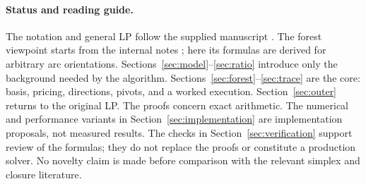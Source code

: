 \documentclass[11pt,a4paper]{article}
\numberwithin{equation}{section}
\theoremstyle{definition}
\theoremstyle{remark}
\begin{document}
\paragraph{Status and reading guide.}
The notation and general LP follow the supplied manuscript
\citet{DoseFuriniLocatelli2026}. The forest viewpoint starts from the internal
notes \citet{ForestNotes}; here its formulas are derived for arbitrary arc
orientations. Sections~\ref{sec:model}--\ref{sec:ratio} introduce only the
background needed by the algorithm. Sections~\ref{sec:forest}--\ref{sec:trace}
are the core: basis, pricing, directions, pivots, and a worked execution.
Section~\ref{sec:outer} returns to the original LP.
The proofs concern exact arithmetic. The numerical and performance variants
in Section~\ref{sec:implementation} are implementation proposals, not measured
results. The checks in Section~\ref{sec:verification} support review of the
formulas; they do not replace the proofs or constitute a production solver.
No novelty claim is made before comparison with the relevant simplex and
closure literature.

\tableofcontents
\clearpage









\appendix



\end{document}
